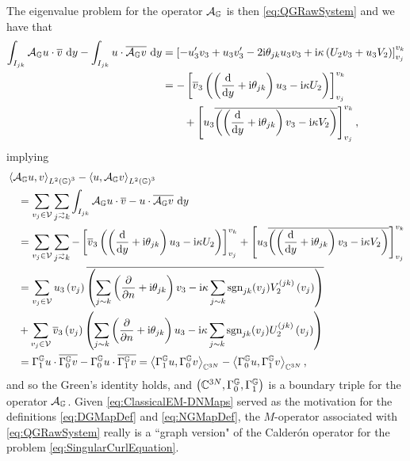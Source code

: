 The eigenvalue problem for the operator $\mathcal{A}_{\mathbb{G}}$ is then \eqref{eq:QGRawSystem} and we have that
\begin{align*}
	\int_{I_{jk}} \mathcal{A}_{\mathbb{G}} u \cdot \overline{v}  \ \mathrm{d}y - \int_{I_{jk}} u \cdot \overline{\mathcal{A}_{\mathbb{G}} v}  \ \mathrm{d}y
	&= \left[  -u'_3 v_3 + u_3 v_3' - 2\mathrm{i}\theta_{jk}u_3 v_3 + \mathrm{i}\kappa\left( U_2 v_3 + u_3 V_2 \right)  \right]_{v_j}^{v_k} \\
	&= -\left[  \overline{v}_3\left(  \left( \dfrac{\mathrm{d}}{\mathrm{d}y} + \mathrm{i}\theta_{jk}  \right)u_3 - \mathrm{i}\kappa U_2  \right)  \right]_{v_j}^{v_k} \\
	&\qquad + \left[  u_3\overline{\left(  \left( \dfrac{\mathrm{d}}{\mathrm{d}y} + \mathrm{i}\theta_{jk}  \right)v_3 - \mathrm{i}\kappa V_2  \right)}  \right]_{v_j}^{v_k},
\end{align*}
implying
\begin{align*}
	&\ip{\ag u}{v}_{L^2\bracs{\graph}^3} - \ip{u}{\ag v}_{L^2\bracs{\graph}^3} \\
	&\quad = \sum_{v_j\in\vertSet}\sum_{j\conLeft k} \integral{I_{jk}}{ \ag u \cdot \overline{v} - u \cdot \overline{\ag v} }{y} \\
	&\quad = \sum_{v_j\in\vertSet}\sum_{j\conLeft k} -\sqbracs{ \overline{v}_3\bracs{ \bracs{\diff{}{y} + \rmi\qm_{jk} }u_3 - \rmi\wavenumber U_2 } }_{v_j}^{v_k}
	+ \sqbracs{ u_3\overline{\bracs{ \bracs{\diff{}{y} + \rmi\qm_{jk} }v_3 - \rmi\wavenumber V_2 }} }_{v_j}^{v_k} \\
	&\quad = \sum_{v_j\in\vertSet} u_3\bracs{v_j}\overline{\bracs{ \sum_{j\con k}\bracs{\pdiff{}{n} + \rmi\qm_{jk}}v_3 - \rmi\wavenumber\sum_{j\con k} \sgn_{jk}(v_j) V_2^{(jk)}\bracs{v_j} }} \\
	&\quad + \sum_{v_j\in\vertSet} \overline{v}_3\bracs{v_j}\bracs{ \sum_{j\con k}\bracs{\pdiff{}{n} + \rmi\qm_{jk}}u_3 - \rmi\wavenumber\sum_{j\con k} \sgn_{jk}(v_j) U_2^{(jk)}\bracs{v_j} } \\
	&\quad = \ngmap u \cdot \overline{\dgmap v} - \dgmap u \cdot \overline{\ngmap v}
	= \ip{\ngmap u}{\dgmap v}_{\complex^{3N}} - \ip{\dgmap u}{\ngmap v}_{\complex^{3N}},
\end{align*}
and so the Green's identity holds, and $\left( \mathbb{C}^{3N}, \Gamma_0^{\mathbb{G}}, \Gamma_1^{\mathbb{G}} \right)$ is a boundary triple for the operator $\mathcal{A}_{\mathbb{G}}$.
Given \eqref{eq:ClassicalEM-DNMaps} served as the motivation for the definitions \eqref{eq:DGMapDef} and \eqref{eq:NGMapDef}, the $M$-operator associated with \eqref{eq:QGRawSystem} really is a ``graph version" of the Calder\'on operator for the problem \eqref{eq:SingularCurlEquation}.